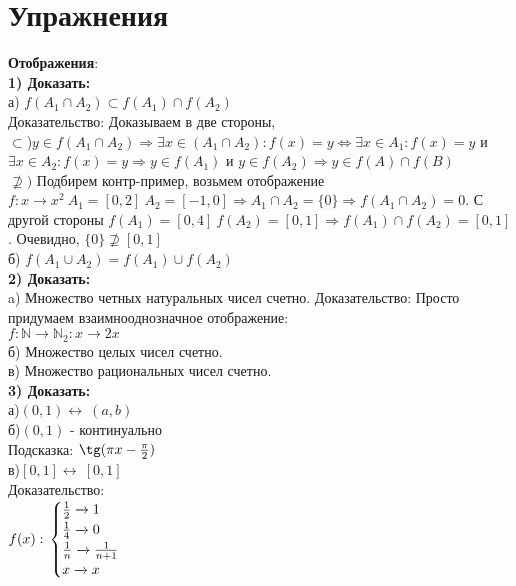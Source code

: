 \documentclass[a4paper]{article}
\begin{document}
\section{Упражнения}
\textbf{Отображения}:\\
\textbf{1) Доказать:}\\
а) $f(A_1 \cap A_2) \subset f(A_1) \cap f(A_2)$\\
Доказательство: Доказываем в две стороны,\\
$\subset$)$ y \in f(A_1 \cap A_2) \Rightarrow \exists x \in (A_1 \cap A_2) : f(x) = y \Leftrightarrow \exists x \in A_1 : f(x) = y$ и $\exists x \in A_2 : f(x) = y \Rightarrow y \in f(A_1)$ и $y \in f(A_2) \Rightarrow y \in f(A) \cap f(B)$\\
$\nsupseteq)$ Подбирем контр-пример, возьмем отображение $f: x \xrightarrow \ x^2 \ A_1 = [0,2] \ A_2 = [-1, 0] \Rightarrow A_1 \cap A_2 = \{0\} \Rightarrow f(A_1 \cap A_2) = 0$. С другой стороны $f(A_1) = [0,4] \ f(A_2) = [0,1] \Rightarrow f(A_1) \cap f(A_2) = [0,1]$. Очевидно, $\{0\} \nsupseteq [0,1]$\\
б) $f(A_1 \cup A_2) = f(A_1) \cup f(A_2)$\\
\textbf{2) Доказать:}\\
a) Множество четных натуральных чисел счетно.
Доказательство: Просто придумаем взаимнооднозначное отображение:\\
$f: \mathbb{N} \xrightarrow \ \mathbb{N}_2: x \xrightarrow \  2x$\\
б) Множество целых чисел счетно.\\
в) Множество рациональных чисел счетно.\\
\textbf{3) Доказать:}\\
а)$(0,1) \longleftrightarrow \ (a,b)$\\
б)$(0,1)$ - континуально\\
Подсказка: $\tg(\pi x - \frac{\pi}{2})$\\
в)$[0,1] \longleftrightarrow \ [0,1]$\\
Доказательство:\\
$f(x):\\
\begin{cases} \frac{1}{2} \xrightarrow \ 1 \\
\frac{1}{4} \xrightarrow \ 0\\ 
\frac{1}{n} \xrightarrow \ \frac{1}{n+1}\\
x \xrightarrow \ x\\
\end{cases}$\\\\
\end{document}
